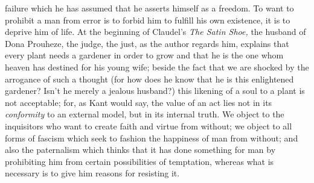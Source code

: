 \documentclass[11pt]{article}
\begin{document}
{{failure which he has assumed that he asserts himself as a freedom. To want to prohibit a man from error is to forbid him to fulfill his own existence, it is to deprive him of life. At the beginning of Claudel’s \textit{The Satin Shoe, }the husband of Dona Prouheze, the judge, the just, as the author regards him, explains that every plant needs a gardener in order to grow and that he is the one whom heaven has destined for his young wife; beside the fact that we are shocked by the arrogance of such a thought (for how does he know that he is this enlightened gardener? Isn’t he merely a jealous husband?) this likening of a soul to a plant is not acceptable; for, as Kant would say, the value of an act lies not in its \textit{conformity} to an external model, but in its internal truth. We object to the inquisitors who want to create faith and virtue from without; we object to all forms of fascism which seek to fashion the happiness of man from without; and also the paternalism which thinks that it has done something for man by prohibiting him from certain possibilities of temptation, whereas what is necessary is to give him reasons for resisting it.

}}
\end{document}

